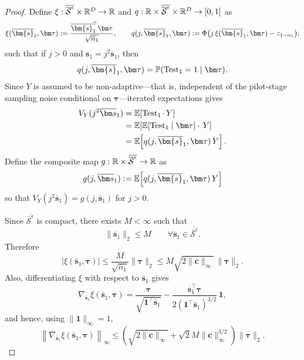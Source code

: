 \begin{proof}
  Define $\xi:\overline{\overline{\mathcal{S}}^{\epsilon}}\times\mathbb{R}^D\to\mathbb{R}$ and $q:\mathbb{R}\times\overline{\overline{\mathcal{S}}^{\epsilon}}\times\mathbb{R}^D\to[0,1]$ as
  \[
    \xi(\overline{\bm{s}}_1,\bm\tau)
    \defeq
    \frac{\overline{\bm{s}}_1^\top\bm\tau}{\sqrt{\overline n_1}},
    \qquad
    q(j,\overline{\bm{s}}_1,\bm\tau)
    \defeq
    \Phi\big(j\,\xi(\overline{\bm{s}}_1,\bm\tau)-z_{1-\alpha_1}\big),
  \]
  such that if $j>0$ and $\bm s_1=j^2\overline{\bm s}_1$, then
  \[
    q(j,\overline{\bm{s}}_1,\bm\tau)
    =
    \P(\Test_1=1\mid \bm\tau).
  \]
  Since $Y$ is assumed to be non-adaptive---that is, independent of the pilot-stage sampling noise conditional on $\bm\tau$---iterated expectations gives
  \begin{align*}
    V_Y(j^2\overline{\bm s}_1)
    & =
    \E\!\left[\Test_1 \cdot \, Y\right] \\
    & =
    \E\!\left[\E\!\left[\Test_1 \mid \bm\tau\right]\cdot \, Y\right] \\
    & =
    \E\!\left[q(j,\overline{\bm{s}}_1,\bm\tau)\,Y\right].
  \end{align*}
  Define the composite map $g:\mathbb{R}\times\overline{\overline{\mathcal{S}}^{\epsilon}}\to\mathbb{R}$ as
  \[
    g(j,\overline{\bm s}_1)
    \defeq
    \E\!\left[q(j,\overline{\bm{s}}_1,\bm\tau)\,Y\right]
  \]
  so that $V_Y(j^2\overline{\bm s}_1)=g(j,\overline{\bm s}_1)$ for $j>0$.

  Since $\overline{\overline{\mathcal{S}}^\epsilon}$ is compact, there exists $M<\infty$ such that
  \[
    \|\overline{\bm s}_1\|_2\le M
    \qquad\forall\overline{\bm s}_1\in \overline{\overline{\mathcal{S}}^\epsilon}.
  \]
  Therefore
  \[
    |\xi(\overline{\bm{s}}_1,\bm\tau)|
    \le
    \frac{M}{\sqrt{\overline n_1}}\|\bm\tau\|_2
    \le
    M\sqrt{2\|\bm c\|_\infty}\,\|\bm\tau\|_2.
  \]
  Also, differentiating $\xi$ with respect to $\overline{\bm s}_1$ gives
  \[
    \nabla_{\overline{\bm s}_1}\xi(\overline{\bm s}_1,\bm\tau)
    =
    \frac{\bm\tau}{\sqrt{\bm 1^\top\overline{\bm s}_1}}
    -
    \frac{\overline{\bm s}_1^\top\bm\tau}{2(\bm 1^\top\overline{\bm s}_1)^{3/2}}\,\bm 1,
  \]
  and hence, using $\|\bm 1\|_\infty=1$,
  \[
    \left\|\nabla_{\overline{\bm s}_1}\xi(\overline{\bm s}_1,\bm\tau)\right\|_\infty
    \le
    \left(\sqrt{2\|\bm c\|_\infty}+\sqrt{2}M\|\bm c\|_\infty^{3/2}\right)\|\bm\tau\|_2.
  \]


\end{proof}

